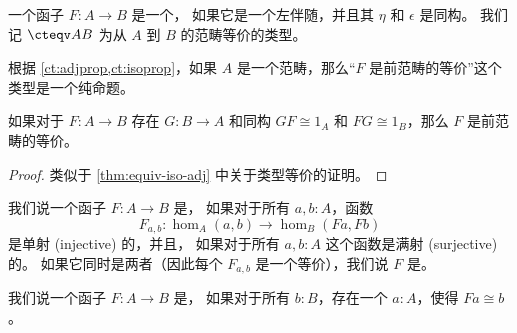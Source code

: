 \begin{defn}\label{ct:equiv}
一个函子 $F:A\to B$ 是一个，
%
%
%
%
如果它是一个左伴随，并且其 $\eta$ 和 $\epsilon$ 是同构。
我们记 $\cteqv A B$ 为从 $A$ 到 $B$ 的范畴等价的类型。
\end{defn}

根据 \cref{ct:adjprop,ct:isoprop}，如果 $A$ 是一个范畴，那么“$F$ 是前范畴的等价”这个类型是一个纯命题。

\begin{lem}\label{ct:adjointification}
如果对于 $F:A\to B$ 存在 $G:B\to A$ 和同构 $GF\cong 1_A$ 和 $FG\cong 1_B$，那么 $F$ 是前范畴的等价。
\end{lem}
\begin{proof}
  类似于 \cref{thm:equiv-iso-adj} 中关于类型等价的证明。
\end{proof}

\begin{defn}\label{ct:full-faithful}
我们说一个函子 $F:A\to B$ 是，
%
%
如果对于所有 $a,b:A$，函数
\[F_{a,b}:\hom_A(a,b) \to \hom_B(Fa,Fb)\]
是单射 (injective) 的，并且，
%
%
如果对于所有 $a,b:A$ 这个函数是满射 (surjective) 的。
如果它同时是两者（因此每个 $F_{a,b}$ 是一个等价），我们说 $F$ 是。
%
%
\end{defn}

\begin{defn}\label{ct:split-essentially-surjective}
我们说一个函子 $F:A\to B$ 是，
%
%
如果对于所有 $b:B$，存在一个 $a:A$，使得 $Fa\cong b$。
\end{defn}

